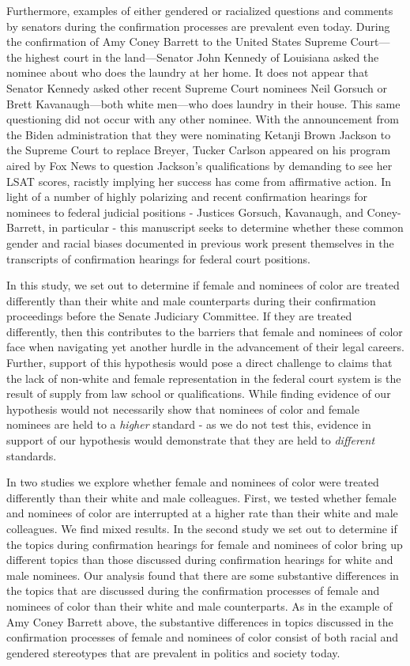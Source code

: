 \documentclass [12pt]{article}
\begin{document}
Furthermore, examples of either gendered or racialized questions and comments by senators during the confirmation processes are prevalent even today. During the confirmation of Amy Coney Barrett to the United States Supreme Court—the highest court in the land—Senator John Kennedy of Louisiana asked the nominee about who does the laundry at her home. It does not appear that Senator Kennedy asked other recent Supreme Court nominees Neil Gorsuch or Brett Kavanaugh—both white men—who does laundry in their house. This same questioning did not occur with any other nominee. With the announcement from the Biden administration that they were nominating Ketanji Brown Jackson to the Supreme Court to replace Breyer, Tucker Carlson appeared on his program aired by Fox News to question Jackson's qualifications by demanding to see her LSAT scores, racistly implying her success has come from affirmative action.  In light of a number of highly polarizing and recent confirmation hearings for nominees to federal judicial positions - Justices Gorsuch, Kavanaugh, and Coney-Barrett, in particular - this manuscript seeks to determine whether these common gender and racial biases documented in previous work present themselves in the transcripts of confirmation hearings for federal court positions. 

In this study, we set out to determine if female and nominees of color are treated differently than their white and male counterparts during their confirmation proceedings before the Senate Judiciary Committee. If they are treated differently, then this contributes to the barriers that female and nominees of color face when navigating yet another hurdle in the advancement of their legal careers. Further, support of this hypothesis would pose a direct challenge to claims that the lack of non-white and female representation in the federal court system is the result of supply from law school or qualifications. While finding evidence of our hypothesis would not necessarily show that nominees of color and female nominees are held to a \textit{higher} standard - as we do not test this, evidence in support of our hypothesis would demonstrate that they are held to \textit{different} standards.

In two studies we explore whether female and nominees of color were treated differently than their white and male colleagues. First, we tested whether female and nominees of color are interrupted at a higher rate than their white and male colleagues. We find mixed results. In the second study we set out to determine if the topics during confirmation hearings for female and nominees of color bring up different topics than those discussed during confirmation hearings for white and male nominees. Our analysis found that there are some substantive differences in the topics that are discussed during the confirmation processes of female and nominees of color than their white and male counterparts. As in the example of Amy Coney Barrett above, the substantive differences in topics discussed in the confirmation processes of female and nominees of color consist of both racial and gendered stereotypes that are prevalent in politics and society today. 
\end{document}
